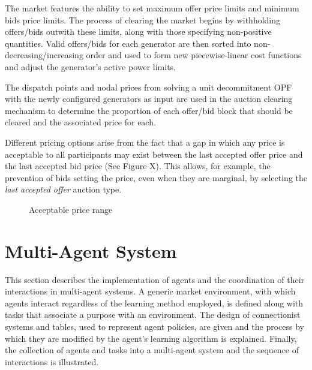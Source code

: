 The market features the ability to set maximum offer price limits and minimum
bids price limits.  The process of clearing the market begins by withholding
offers/bids outwith these limits, along with those specifying non-positive
quantities.  Valid offers/bids for each generator are then sorted into
non-decreasing/increasing order and used to form new piecewise-linear cost
functions and adjust the generator's active power limits.

The dispatch points and nodal prices from solving a unit decommitment OPF with
the newly configured generators as input are used in the auction clearing
mechanism to determine the proportion of each offer/bid block that should be
cleared and the associated price for each.

Different pricing options arise from the fact that a gap in which any price is
acceptable to all participants may exist between the last accepted offer price
and the last accepted bid price (See Figure X).  This allows, for example,
the prevention of bids setting the price, even when they are marginal, by
selecting the \textit{last accepted offer} auction type.

\begin{figure}
\label{fig:aution_types}
\centering
{}
\caption{Acceptable price range}
\end{figure}

\section{Multi-Agent System}
\label{sec:mas}
This section describes the implementation of agents and the coordination of
their interactions in multi-agent systems.  A generic market environment, with
which agents interact regardless of the learning method employed, is defined
along with tasks that associate a purpose with an environment.  The design of
connectionist systems and tables, used to represent agent policies, are given
and the process by which they are modified by the agent's learning algorithm is
explained.  Finally, the collection of agents and tasks into a multi-agent
system and the sequence of interactions is illustrated.

